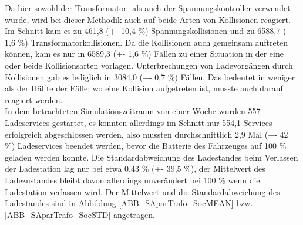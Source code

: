 Da hier sowohl der Transformator- als auch der Spannungskontroller verwendet wurde, wird bei dieser Methodik auch auf beide Arten von Kollisionen reagiert. Im Schnitt kam es zu 461,8 (+- 10,4 \%) Spannungskollisionen und zu 6588,7 (+- 1,6 \%) Transformatorkollisionen. Da die Kollisionen auch gemeinsam auftreten können, kam es nur in 6589,3 (+- 1,6 \%) Fällen zu einer Situation in der eine oder beide Kollisionsarten vorlagen. Unterbrechungen von Ladevorgängen durch Kollisionen gab es lediglich in 3084,0 (+- 0,7 \%) Fällen. Das bedeutet in weniger als der Hälfte der Fälle; wo eine Kollision aufgetreten ist, musste auch darauf reagiert werden.\\
In dem betrachteten Simulationszeitraum von einer Woche wurden 557 Ladeservices gestartet, es konnten allerdings im Schnitt nur 554,1 Services erfolgreich abgeschlossen werden, also mussten durchschnittlich 2,9 Mal (+- 42 \%) Ladeservices beendet werden, bevor die Batterie des Fahrzeuges auf 100 \% geladen werden konnte. Die Standardabweichung des Ladestandes beim Verlassen der Ladestation lag nur bei etwa 0,43 \% (+- 39,5 \%), der Mittelwert des Ladezustandes bleibt davon allerdings unverändert bei 100 \% wenn die Ladestation verlassen wird. Der Mittelwert und die Standardabweichung des Ladestandes sind in Abbildung \ref{ABB_SAparTrafo_SocMEAN} bzw. \ref{ABB_SAparTrafo_SocSTD} angetragen.\\
